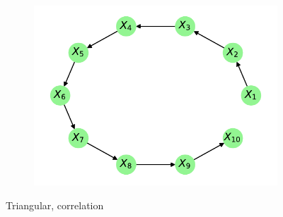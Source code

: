 \documentclass[../Thesis.tex]{subfiles}
\begin{document}
\begin{figure}[h]
\begin{subfigure}[t]{0.49\textwidth}
        \caption{}
    \end{subfigure}
    \\[\baselineskip]
    \begin{subfigure}[t]{0.49\textwidth}
        \centering
        \includegraphics[width=\linewidth]{figures/Gaussian Chain Theoretical/Chain graph from triangular G obs.pdf}
        \caption{}
    \end{subfigure}
    \caption{Triangular, correlation}
\end{figure}
\end{document}
